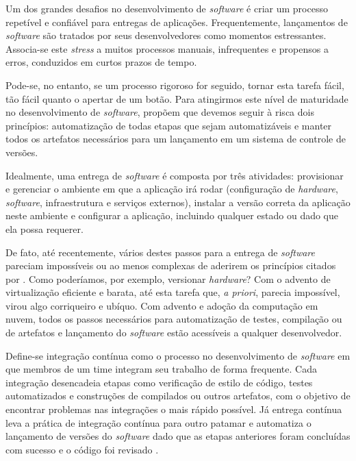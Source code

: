 \label{capitulo:cicd}
  Um dos grandes desafios no desenvolvimento de \emph{software} é criar um processo repetível e 
  confiável para entregas de aplicações. Frequentemente, lançamentos de \emph{software} são
  tratados por seus desenvolvedores como momentos estressantes. Associa-se este \emph{stress} a
  muitos processos manuais, infrequentes e propensos a erros, conduzidos em curtos prazos 
  de tempo.
  
  Pode-se, no entanto, se um processo rigoroso for seguido,  
  tornar esta tarefa fácil, tão fácil quanto o apertar de um botão.
  Para atingirmos este nível de maturidade no desenvolvimento de 
  \emph{software},  propõem que
  devemos seguir à risca dois princípios: automatização de todas etapas que sejam 
  automatizáveis e manter todos os artefatos necessários para um lançamento em um sistema de 
  controle de versões. 

  Idealmente, uma entrega de \emph{software} é composta por três atividades: 
  provisionar e gerenciar o ambiente em que a aplicação irá rodar (configuração de \emph{hardware},
  \emph{software}, infraestrutura e serviços externos), instalar a versão correta da aplicação 
  neste ambiente e configurar a aplicação, incluindo qualquer estado ou dado que ela possa requerer.

  De fato, até recentemente, vários destes passos para a entrega de \emph{software} pareciam 
  impossíveis ou ao menos complexas de aderirem os princípios citados por 
  . Como poderíamos, por exemplo, 
  versionar \emph{hardware}? Com o advento de virtualização eficiente e barata, até esta 
  tarefa que, \emph{a priori}, parecia impossível, virou algo corriqueiro e ubíquo. 
  Com advento e adoção da computação em nuvem, todos os passos necessários para automatização 
  de testes, compilação ou de artefatos e lançamento do \emph{software} estão 
  acessíveis a qualquer desenvolvedor.

  Define-se integração contínua como o processo no desenvolvimento de \emph{software} em que 
  membros de um time integram seu trabalho de forma frequente. Cada integração desencadeia etapas 
  como verificação de estilo de código, testes automatizados e construções de compilados ou 
  outros artefatos, com o objetivo de encontrar problemas nas integrações o mais rápido possível.
  Já entrega contínua leva a prática de integração contínua para outro patamar e automatiza 
  o lançamento de versões do \emph{software} dado que as etapas anteriores foram concluídas com 
  sucesso e o código foi revisado \cite{fowler2006continuous}.
